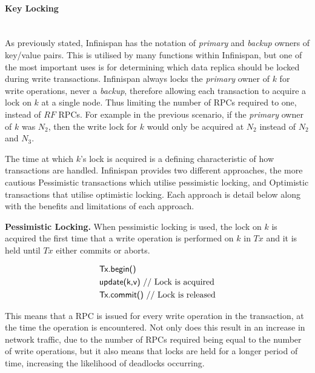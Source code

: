 	        \paragraph{Key Locking} \hspace{0pt} \\
	        As previously stated, Infinispan has the notation of \emph{primary} and \emph{backup} owners of key/value pairs.  This is utilised by many functions within Infinispan, but one of the most important uses is for determining which data replica should be locked during write transactions.  Infinispan always locks the \emph{primary} owner of $k$ for write operations, never a \emph{backup}, therefore allowing each transaction to acquire a lock on $k$ at a single node.  Thus limiting the number of RPCs required to one, instead of $RF$ RPCs. For example in the previous scenario, if the \emph{primary} owner of $k$ was $N_2$, then the write lock for $k$ would only be acquired at $N_2$ instead of $N_2$ and $N_3$.  
	        
	        The time at which $k$'s lock is acquired is a defining characteristic of how transactions are handled.  Infinispan provides two different approaches, the more cautious Pessimistic transactions which utilise pessimistic locking, and Optimistic transactions that utilise optimistic locking.  Each approach is detail below along with the benefits and limitations of each approach.  
	         
            \textbf{Pessimistic Locking.}
            When pessimistic locking is used, the lock on $k$ is acquired the first time that a write operation is performed on $k$ in $Tx$ and it is held until $Tx$ either commits or aborts.  
	        
	        \begin{equation*}
		     \begin{aligned}
		       & \text{\textsf{Tx.begin()}} \\
		       & \text{\textsf{update(k,v)}   // Lock is acquired} \\
		       & \text{\textsf{Tx.commit()}  // Lock is released} \\
		     \end{aligned}
		    \end{equation*}

            This means that a RPC is issued for every write operation in the transaction, at the time the operation is encountered.  Not only does this result in an increase in network traffic, due to the number of RPCs required being equal to the number of write operations, but it also means that locks are held for a longer period of time, increasing the likelihood of deadlocks occurring.  
            
